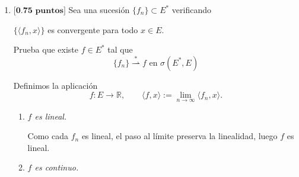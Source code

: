 \documentclass[12pt]{article}
\begin{document}
\begin{ejercicio}
\begin{enumerate}[label=\alph*)]
\begin{teo}
\begin{proof}
\begin{description}
\begin{equation*}
                                x_0 \in \{y\in E : \langle f,y \rangle <\alpha\} = f^{-1}(\left]-\infty,\alpha\right[)
                            \end{equation*}
                            con $f^{-1}(\left]-\infty,\alpha\right[)$ un conjunto $\sigma(E,E^\ast)-$abierto\footnote{También podríamos haber dicho que $f^{-1}(\left]-\infty,\alpha\right[) = V(f;\alpha)$.}, por la definición de $\sigma(E,E^\ast)$. Como $f^{-1}(\left]-\infty,\alpha\right[)\cap A = \emptyset $, tenemos que:
                            \begin{equation*}
                                x_0 \in f^{-1}(\left]-\infty,\alpha\right[) \subset E\setminus A
                            \end{equation*}
                            Como $x_0$ era un punto de $E\setminus A$ arbitrario, tenemos que $E\setminus A$ es $\sigma(E,E^\ast)-$abierto, lo que concluye la demostración.\qedhere
                    \end{description}
                \end{proof}
            \end{teo}
            \newpage
            
            \item $\textbf{[0.75 puntos]}$ Sea una sucesión $\{f_n\}\subset E^\ast$ verificando
                \begin{center}
                    $\{\langle f_n,x \rangle \}$ es convergente para todo $x\in E$.
                \end{center}
                Prueba que existe $f\in E^\ast$ tal que
                \begin{equation*}
                    \{f_n\}\stackrel{\ast}{\rightharpoonup} f \text{\ en\ } \sigma(E^\ast,E)
                \end{equation*}
            
            Definimos la aplicación
            \[
            f:E\longrightarrow \mathbb{R}, 
            \qquad 
            \langle f,x\rangle := \lim_{n\to\infty}\langle f_n,x\rangle .
            \]
            
            \begin{enumerate}
            \item \textit{$f$ es lineal.}
            
            Como cada $f_n$ es lineal, el paso al límite preserva la linealidad, luego $f$ es lineal.
            
            \item \textit{$f$ es continuo.}
            

\end{enumerate}
\end{enumerate}
\end{ejercicio}
\end{document}
